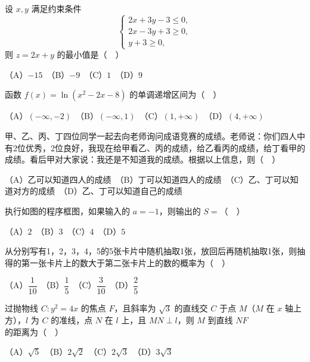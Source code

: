 \begin{question}
设 \(x,y\) 满足约束条件
\nopagebreak[4]
\[
\begin{cases}
2x+3y-3\le 0,\\
2x-3y+3\ge 0,\\
y+3\ge 0,
\end{cases}
\]
则 \(z=2x+y\) 的最小值是（　）

（A）\(-15\)　（B）\(-9\)　（C）\(1\)　（D）\(9\)

\end{question}
\begin{question}
函数 \(f(x)=\ln(x^2-2x-8)\) 的单调递增区间为（　）

（A）\((-\infty,-2)\)　（B）\((-\infty,1)\)　（C）\((1,+\infty)\)　（D）\((4,+\infty)\)

\end{question}
\begin{question}
甲、乙、丙、丁四位同学一起去向老师询问成语竞赛的成绩。老师说：你们四人中有2位优秀，2位良好，我现在给甲看乙、丙的成绩，给乙看丙的成绩，给丁看甲的成绩。看后甲对大家说：我还是不知道我的成绩。根据以上信息，则（　）

（A）乙可以知道四人的成绩　（B）丁可以知道四人的成绩　（C）乙、丁可以知道对方的成绩　（D）乙、丁可以知道自己的成绩

\Needspace{0.4\textheight}
\end{question}
\begin{question}
执行如图的程序框图，如果输入的 \(a=-1\)，则输出的 \(S=\)（　）
\nopagebreak[4]
\begin{center}\end{center}
\nopagebreak[4]
（A）\(2\)　（B）\(3\)　（C）\(4\)　（D）\(5\)

\end{question}
\begin{question}
从分别写有1，2，3，4，5的5张卡片中随机抽取1张，放回后再随机抽取1张，则抽得的第一张卡片上的数大于第二张卡片上的数的概率为（　）

（A）\(\dfrac{1}{10}\)　（B）\(\dfrac{1}{5}\)　（C）\(\dfrac{3}{10}\)　（D）\(\dfrac{2}{5}\)

\end{question}
\begin{question}
过抛物线 \(C:y^2=4x\) 的焦点 \(F\)，且斜率为 \(\sqrt3\) 的直线交 \(C\) 于点 \(M\)（\(M\) 在 \(x\) 轴上方），\(l\) 为 \(C\) 的准线，点 \(N\) 在 \(l\) 上，且 \(MN\perp l\)，则 \(M\) 到直线 \(NF\) 的距离为（　）

（A）\(\sqrt5\)　（B）\(2\sqrt2\)　（C）\(2\sqrt3\)　（D）\(3\sqrt3\)

\end{question}

